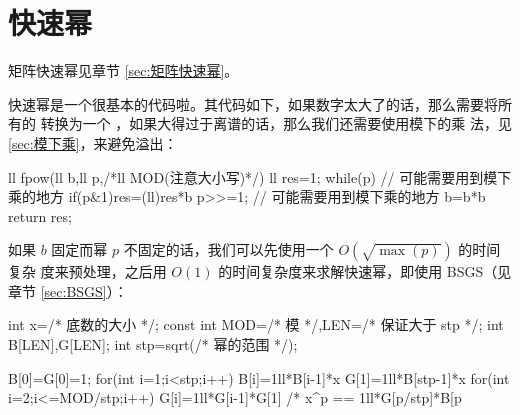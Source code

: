 \section{快速幂}
\label{sec:快速幂}

矩阵快速幂见章节 \ref{sec:矩阵快速幂}。

快速幂是一个很基本的代码啦。其代码如下，如果数字太大了的话，那么需要将所有的
 转换为一个 ，如果大得过于离谱的话，那么我们还需要使用模下的乘
法，见 \ref{sec:模下乘}，来避免溢出：
\begin{Cpp}
ll fpow(ll b,ll p,/*ll MOD(注意大小写)*/){
  ll res=1;
  while(p){
    // 可能需要用到模下乘的地方
    if(p&1)res=(ll)res*b%
    p>>=1;
    // 可能需要用到模下乘的地方
    b=b*b%
  }
  return res;
}
\end{Cpp}

如果 $b$ 固定而幂 $p$ 不固定的话，我们可以先使用一个 $O(\sqrt{\max(p)})$ 的时间复杂
度来预处理，之后用 $O(1)$ 的时间复杂度来求解快速幂，即使用 BSGS（见章节
\ref{sec:BSGS}）：
\begin{Cpp}
{
  int x=/* 底数的大小 */;
  const int MOD=/* 模 */,LEN=/* 保证大于 stp */;
  int B[LEN],G[LEN];
  int stp=sqrt(/* 幂的范围 */);

  B[0]=G[0]=1;
  for(int i=1;i<stp;i++){
    B[i]=1ll*B[i-1]*x%
  }
  G[1]=1ll*B[stp-1]*x%
  for(int i=2;i<=MOD/stp;i++){
    G[i]=1ll*G[i-1]*G[1]%
  }
  /* x^p == 1ll*G[p/stp]*B[p%
}
\end{Cpp}
